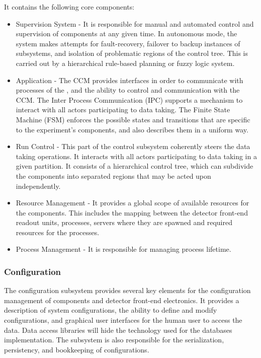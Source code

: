 It contains the following core components:
\begin{itemize}
\item Supervision System - It is responsible for manual and automated control and supervision of  components at any given time. In autonomous mode, the system makes attempts for fault-recovery, failover to backup instances of subsystems, and isolation of problematic regions of the control tree. This is carried out by a hierarchical rule-based planning or fuzzy logic system.
\item {} Application - The CCM provides interfaces in order to communicate with processes of the , and the ability to control and communication with the CCM. The Inter Process Communication (IPC) supports a mechanism to interact with all actors participating to data taking. The Finite State Machine (FSM) enforces the possible states and transitions that are specific to the experiment's components, and also describes them in a uniform way.
\item Run Control - This part of the control subsystem coherently steers the data taking operations. It interacts with all actors participating to data taking in a given partition. It consists of a hierarchical control tree, which can subdivide the  components into separated regions that may be acted upon independently.
\item Resource Management - It provides a global scope of available resources for the  components. This includes the mapping between the detector front-end readout units, processes, servers where they are spawned and required resources for the processes.
\item Process Management - It is responsible for managing process lifetime.
\end{itemize}

\subsubsection{Configuration}
\label{sec:daq:design:ccm:configuration}

The configuration subsystem provides several key elements for the configuration management of  components and detector front-end electronics. It provides a description of system configurations, the ability to define and modify configurations, and graphical user interfaces for the human user to access the data. Data access libraries will hide the technology used for the databases implementation. The subsystem is also responsible for the serialization, persistency, and bookkeeping of configurations. 

